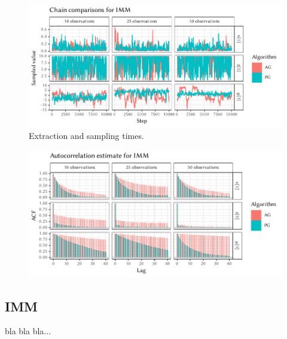 \begin{figure}[p]
  \par
  \includegraphics[width=\textwidth]{figures/IMM-chains}
  \caption{Extraction and sampling times.}
\end{figure}

\cleartorecto
\FloatBlock

\begin{figure}[t]
  \centering
  \includegraphics[width=\textwidth]{figures/IMM-acfs}
  \label{fig:plots-imm}
\end{figure}

\subsection*{IMM}

bla bla bla...

